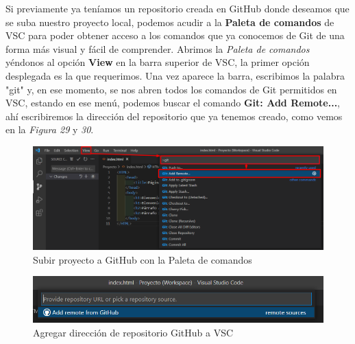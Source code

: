 Si previamente ya teníamos un repositorio creada en GitHub donde deseamos que se suba nuestro proyecto local, podemos acudir a la \textbf{Paleta de comandos} de VSC para poder obtener acceso a los comandos que ya conocemos de Git de una forma más visual y fácil de comprender. Abrimos la \textit{Paleta de comandos} yéndonos al opción \textbf{View} en la barra superior de VSC, la primer opción desplegada es la que requerimos. Una vez aparece la barra, escribimos la palabra "git" y, en ese momento, se nos abren todos los comandos de Git permitidos en VSC, estando en ese menú, podemos buscar el comando \textbf{Git: Add Remote...}, ahí escribiremos la dirección del repositorio que ya tenemos creado, como vemos en la \textit{Figura 29} y \textit{30}.
\begin{figure}[H]
    \begin{center}
        \caption{Subir proyecto a GitHub con la Paleta de comandos}
        \label{fig: 29}
        \includegraphics[width=14cm]{capturas/subir_proyecto3.png}
    \end{center}
\end{figure}
\begin{figure}[H]
    \begin{center}
        \caption{Agregar dirección de repositorio GitHub a VSC}
        \label{fig: 30}
        \includegraphics[width=14cm]{capturas/subir_proyecto4.png}
    \end{center}
\end{figure}

